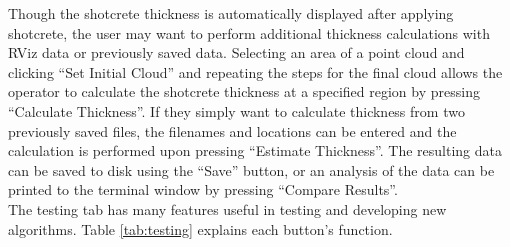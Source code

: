 Though the shotcrete thickness is automatically displayed after applying shotcrete, the user may want to perform additional thickness calculations with RViz data or previously saved data. Selecting an area of a point cloud and clicking ``Set Initial Cloud'' and repeating the steps for the final cloud allows the operator to calculate the shotcrete thickness at a specified region by pressing ``Calculate Thickness''. If they simply want to calculate thickness from two previously saved files, the filenames and locations can be entered and the calculation is performed upon pressing ``Estimate Thickness''. The resulting data can be saved to disk using the ``Save'' button, or an analysis of the data can be printed to the terminal window by pressing ``Compare Results''.\\

The testing tab has many features useful in testing and developing new algorithms. Table \ref{tab:testing} explains each button's function.\\

